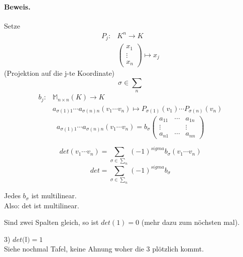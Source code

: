 \documentclass[9pt]{article} %
\begin{document}
\begin{prop}
    \paragraph{Beweis.} Setze 
    \begin{align*}
        P_j : & K^n \rightarrow K \\
        & \begin{pmatrix}
        x_1 \\ \vdots \\ x_n
        \end{pmatrix} \mapsto x_j 
    \end{align*}
    (Projektion auf die j-te Koordinate)
    \[\sigma \in \sum_n\]
    \begin{align*}
        b_j: & \mathbb{M}_{n\times n}(K) \rightarrow K \\
        & a_{\sigma(1)1} \cdots a_{\sigma(n)n} (v_1 \cdots v_n) \mapsto P_{\sigma(1)}(v_1)
 \cdots P_{\sigma(n)}(v_n)    \end{align*}
 \begin{equation}
    a_{\sigma(1)1} \cdots a_{\sigma(n)n} (v_1 \cdots v_n) = b_{\sigma} 
    \begin{pmatrix}
    a_{11} & \cdots  & a_{1n} \\
    \vdots & & \vdots \\
    a_{n1} & \cdots & a_{nn}
    \end{pmatrix}
 \end{equation}
\end{prop}
\begin{beob}
\[
det (v_1 \cdots v_n) = \sum_{\sigma \in \sum_n} (-1)^{sigma} b_{\sigma} (v_1 \cdots v_n)
\]
\[
det = \sum_{\sigma \in \sum_n} (-1)^{sigma} b_{\sigma}
\]
\end{beob}
\begin{beob}
       Jedes $b_{\sigma}$ ist multilinear. \\
   Also: det ist multilinear. 
\end{beob}
\begin{beh}
   Sind zwei Spalten gleich, so ist $det(1) = 0$ (mehr dazu zum nöchsten mal). 
\end{beh}
3) $det(\mathbb{I)} = 1$ \\
Siehe nochmal Tafel, keine Ahnung woher die 3 plötzlich kommt. 
\end{document}
